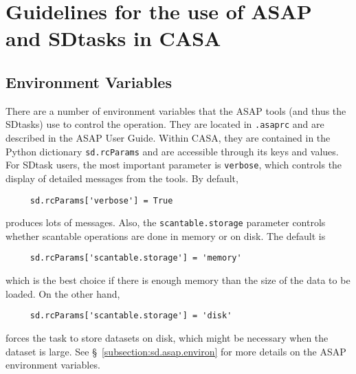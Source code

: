 \section{Guidelines for the use of ASAP and SDtasks in CASA}
\label{section:sd.intro}

\subsection{Environment Variables}
\label{section:sd.intro.env}

There are a number of environment variables that the ASAP tools
(and thus the SDtasks) use to control the operation.
They are located in {\tt .asaprc} and are described in the ASAP User Guide.
Within CASA, they are contained in the
Python dictionary {\tt sd.rcParams} and are accessible through
its keys and values.  For SDtask users, the most important parameter is
{\tt verbose}, which controls the display of detailed
messages from the tools. By default,
\small
\begin{verbatim}
     sd.rcParams['verbose'] = True
\end{verbatim}
\normalsize
produces lots of messages.  Also, the {\tt scantable.storage}
parameter controls whether scantable operations are done
in memory or on disk.  The default is  
\small
\begin{verbatim}
     sd.rcParams['scantable.storage'] = 'memory'  
\end{verbatim}
\normalsize
which is the best choice if there is enough memory
than the size of the data to be loaded.  On the other hand,
\small
\begin{verbatim}
     sd.rcParams['scantable.storage'] = 'disk'
\end{verbatim}
\normalsize
forces the task to store datasets on disk, which might be necessary when the 
dataset is large.
See \S~\ref{subsection:sd.asap.environ} for more details on the
ASAP environment variables.

